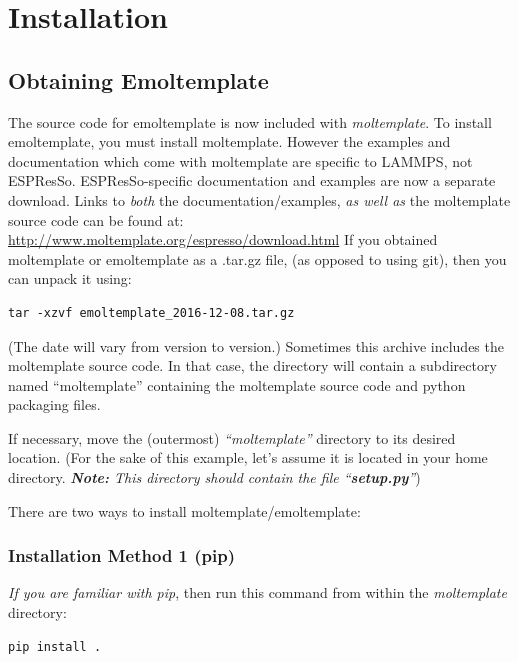 \documentclass[11pt]{article}
\begin{document}
\section{Installation}

\subsection*{Obtaining Emoltemplate}

The source code for emoltemplate is now included with \textit{moltemplate}.
To install emoltemplate, you must install moltemplate.
However the examples and documentation
which come with moltemplate are specific to LAMMPS, not ESPResSo.
ESPResSo-specific documentation and examples are now a separate download.
Links to \textit{both} the documentation/examples, \textit{as well as} the
moltemplate source code can be found at:
\url{http://www.moltemplate.org/espresso/download.html}
If you obtained moltemplate or emoltemplate as a .tar.gz file,
(as opposed to using git), then you can unpack it using:
\begin{verbatim}
tar -xzvf emoltemplate_2016-12-08.tar.gz
\end{verbatim}
(The date will vary from version to version.)
Sometimes this archive includes the moltemplate source code.
In that case, the directory will contain a subdirectory named ``moltemplate''
containing the moltemplate source code and python packaging files.

If necessary, move the (outermost) \textit{``moltemplate''} directory to its 
desired location. (For the sake of this example, let's assume it is located
in your home directory.
\textit{\textbf{Note:} This directory should contain the file
        ``\textbf{setup.py}''})

There are two ways to install moltemplate/emoltemplate:

\subsubsection*{Installation Method 1 (pip)}

\textit{If you are familiar with pip}, then run this command from within
the \textit{moltemplate} directory:
\begin{verbatim}
pip install .
\end{verbatim}
\end{document}
